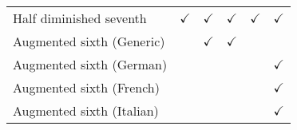 \begin{tabular}{llllll}
Half diminished seventh   & $\checkmark$      & $\checkmark$                        & $\checkmark$                        & $\checkmark$                           & $\checkmark$                 \\
Augmented sixth (Generic) &         & $\checkmark$                        & $\checkmark$                        &                              &                    \\
Augmented sixth (German)  &         &                           &                           &                              & $\checkmark$                 \\
Augmented sixth (French)  &         &                           &                           &                              & $\checkmark$                 \\
Augmented sixth (Italian) &         &                           &                           &                              & $\checkmark$                
\end{tabular}
